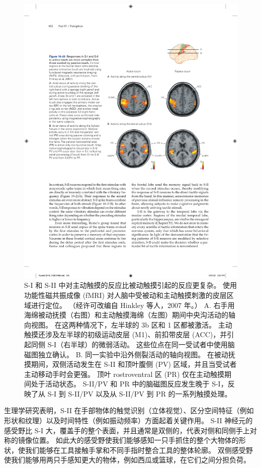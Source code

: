 \begin{figure}[htbp]
	\centering
	\includegraphics[width=1.0\linewidth]{chap19/fig_19_20}
	\caption{S-I 和 S-II 中对主动触摸的反应比被动触摸引起的反应更复杂。 
		使用功能性磁共振成像 (fMRI) 对人脑中受被动和主动触摸刺激的皮层区域进行定位。 （经许可改编自 Hinkley 等人，2007 年。）
		A. 右手用海绵被动抚摸（右图）和主动触摸海绵（左图）期间中央沟活动的轴向视图。 在这两种情况下，左半球的 3b 区和 1 区都被激活。 
		主动触摸还涉及左半球的初级运动皮层 (M1)、前扣带皮层 (ACC)，并引起同侧 S-I（右半球）的微弱活动。 
		这些位点在同一受试者中使用脑磁图独立确认。 
		B. 同一实验中沿外侧裂活动的轴向视图。 
		在被动抚摸期间，双侧活动发生在 S-II 和顶叶腹侧 (PV) 区域，并且当受试者主动移动手时会更强。 
		顶叶 rostroventral 区 (PR) 仅在主动触摸期间处于活动状态。 
		S-II/PV 和 PR 中的脑磁图反应发生晚于 S-I，反映了从 S-I 到 S-II/PV 以及从 S-II/PV 到 PR 的一系列触摸处理。}
	\label{fig:19_20}
\end{figure}

生理学研究表明，S-II 在手部物体的触觉识别（立体视觉）、区分空间特征（例如形状和纹理）以及时间特性（例如振动频率）方面起着关键作用。 
S-II 神经元的感受野比 S-I 大，覆盖手的整个表面，并且通常是双侧的，代表对侧和同侧手上对称的镜像位置。 
如此大的感受野使我们能够感知一只手抓住的整个大物体的形状，使我们能够在工具接触手掌和不同手指时整合工具的整体轮廓。 
双侧感受野使我们能够用两只手感知更大的物体，例如西瓜或篮球，在它们之间分担负荷。



